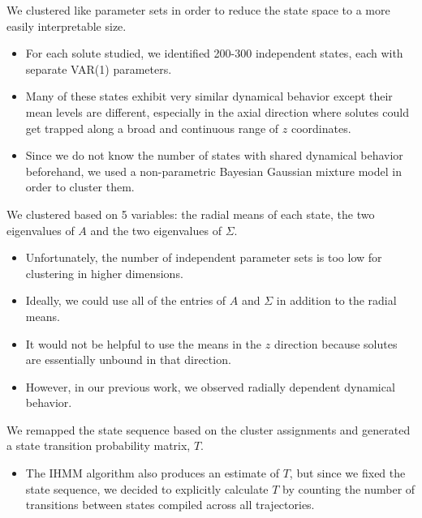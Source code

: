 \documentclass{article}
\begin{document}
  We clustered like parameter sets in order to reduce the state space to
  a more easily interpretable size.
  \begin{itemize}
  \item For each solute studied, we identified 200-300 independent states, each
  with separate VAR(1) parameters. %
   \item Many of these states exhibit very similar dynamical behavior except their
   mean levels are different, especially in the axial direction where solutes could
   get trapped along a broad and continuous range of $z$ coordinates.
   \item Since we do not know the number of states with shared dynamical behavior
   beforehand, we used a non-parametric Bayesian Gaussian mixture model in order
   to cluster them. %
  \end{itemize}   
 
  We clustered based on 5 variables: the radial means of each state, the two
  eigenvalues of $A$ and the two eigenvalues of $\Sigma$.
  \begin{itemize}
   \item Unfortunately, the number of independent parameter sets is too low for
   clustering in higher dimensions. 
   \item Ideally, we could use all of the entries of $A$ and $\Sigma$ in addition to 
   the radial means.
   \item It would not be helpful to use the means in the $z$ direction because solutes
   are essentially unbound in that direction.
   \item However, in our previous work, we observed radially dependent dynamical 
   behavior.~\cite{coscia_chemically_2019}  %
  \end{itemize}

  We remapped the state sequence based on the cluster assignments and
  generated a state transition probability matrix, $T$.
  \begin{itemize}
   \item The IHMM algorithm also produces an estimate of $T$, but since we 
   fixed the state sequence, we decided to explicitly calculate $T$ by 
   counting the number of transitions between states compiled across all 
   trajectories.
  \end{itemize}  
  
\end{document}

